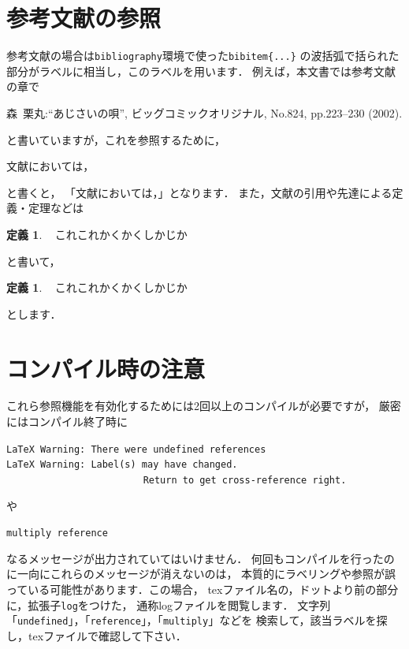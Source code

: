 \documentclass[a4j,12pt,dvipdfmx,oneside]{jsbook}
\theoremstyle{definition}
\newtheorem{Def}[theorem]{定義}
\begin{document}
\section{参考文献の参照}\label{sec:reference_cite}
%
%
%
参考文献の場合は\texttt{bibliography}環境で使った\texttt{bibitem\{...\}}
の波括弧で括られた部分がラベルに相当し，このラベルを用います．
例えば，本文書では参考文献の章で
\begin{verbatimtab}
\begin{thebibliography}{99}
森~栗丸:``あじさいの唄'', ビッグコミックオリジナル, No.824, pp.223--230 (2002).
\end{thebibliography}
\end{verbatimtab}
と書いていますが，これを参照するために，
\begin{verbatimtab}
文献\cite{mori}においては，
\end{verbatimtab}
と書くと，
「文献\cite{mori}においては，」となります．
また，文献の引用や先達による定義・定理などは
\begin{verbatimtab}
\begin{Def}~\cite{kanzawa}
これこれかくかくしかじか
\end{Def}
\end{verbatimtab}
と書いて，
\begin{Def}~\cite{kanzawa}
これこれかくかくしかじか
\end{Def}
とします．
%
%
%
\section{コンパイル時の注意}\label{sec:reference_compile}
%
%
%
これら参照機能を有効化するためには2回以上のコンパイルが必要ですが，
厳密にはコンパイル終了時に
\begin{screen}
\texttt{LaTeX Warning: There were undefined references}\\
\texttt{LaTeX Warning: Label(s) may have changed. \\
　　　　　　　　　　　　　　 Return to get cross-reference right.}
\end{screen}
や
\begin{screen}
\texttt{multiply reference}
\end{screen}
なるメッセージが出力されていてはいけません．
何回もコンパイルを行ったのに一向にこれらのメッセージが消えないのは，
本質的にラベリングや参照が誤っている可能性があります．この場合，
texファイル名の，ドットより前の部分に，拡張子\texttt{log}をつけた，
通称logファイルを閲覧します．
文字列「\texttt{undefined}」，「\texttt{reference}」，「\texttt{multiply}」などを
検索して，該当ラベルを探し，texファイルで確認して下さい．
%
%
%
\end{document}
